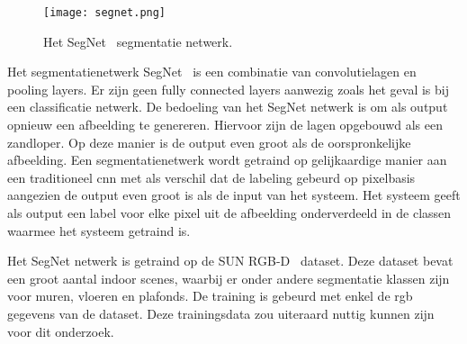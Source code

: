         \begin{figure}[!hb]
            \centering
            \texttt{[image: segnet.png]}
            \caption{Het SegNet~\cite{Badrinarayanan} segmentatie netwerk.}
            \label{fig:segnet_cnn}
        \end{figure}

        Het segmentatienetwerk SegNet~\cite{Badrinarayanan} is een combinatie van convolutielagen en pooling layers. Er zijn geen fully connected layers aanwezig zoals het geval is bij een classificatie netwerk.
        De bedoeling van het SegNet netwerk is om als output opnieuw een afbeelding te genereren. Hiervoor zijn de lagen opgebouwd als een zandloper. Op deze manier is de output even groot als de oorspronkelijke afbeelding.
        Een segmentatienetwerk wordt getraind op gelijkaardige manier aan een traditioneel \gls{cnn} met als verschil dat de labeling gebeurd op pixelbasis aangezien de output even groot is als de input van het systeem.
        Het systeem geeft als output een label voor elke pixel uit de afbeelding onderverdeeld in de classen waarmee het systeem getraind is.

        Het SegNet netwerk is getraind op de SUN RGB-D~\cite{Song_2015_CVPR} dataset. Deze dataset bevat een groot aantal indoor scenes, waarbij er onder andere segmentatie klassen zijn voor muren, vloeren en plafonds.
        De training is gebeurd met enkel de \gls{rgb} gegevens van de dataset. Deze trainingsdata zou uiteraard nuttig kunnen zijn voor dit onderzoek.
